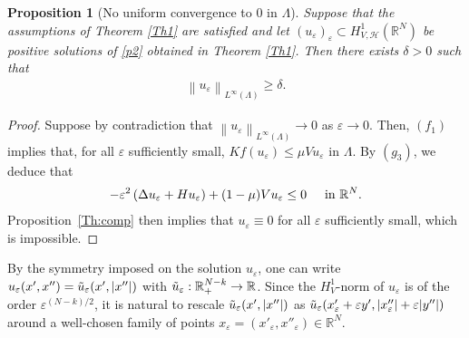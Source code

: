 \documentclass[a4paper]{amsart}
\newtheorem{proposition}{Proposition}[section]
\begin{document}
\begin{proposition}[No uniform convergence to $0$ in $\Lambda$]
 Suppose that the assumptions of Theorem \ref{Th1} are satisfied and let $(u_{\varepsilon})_{\varepsilon} \subset
H^1_{V,\mathcal{H}}({\mathbb{R}}^N)$ be positive solutions of \eqref{p2} obtained in Theorem \ref{Th1}. Then there exists $\delta
> 0$ such that 
\begin{align*}
 {\left\| {u_{\varepsilon}} \right\|}_{L^{\infty}(\Lambda)} \geq \delta.
\end{align*}
\end{proposition}
\begin{proof}
 Suppose by contradiction that ${\left\| {u_{\varepsilon}} \right\|}_{L^{\infty}(\Lambda)} \to 0$ as $\varepsilon \to 0$. Then, $(f_1)$
implies that, for all $\varepsilon$ sufficiently small, $K f(u_{\varepsilon}) \leq \mu V u_{\varepsilon}$ in $\Lambda$. By
$(g_3)$, we deduce that
\begin{align*}
 -\varepsilon^2 \left( \Delta u_{\varepsilon} + H u_{\varepsilon} \right) + (1 - \mu)V u_{\varepsilon} \leq 0 \hspace{0.5cm}
\text{in}\ {\mathbb{R}}^N.
\end{align*}
Proposition~\ref{Th:comp} then implies that $u_{\varepsilon} \equiv 0$ for all $\varepsilon$ sufficiently small, which is
impossible.
\end{proof}

 By the symmetry imposed on the solution $u_{\varepsilon}$, one can write $u_{\varepsilon}(x',x'') =
\Tilde{u}_{\varepsilon}(x',{\left| {x''} \right|})$ with $\Tilde{u}_{\varepsilon} : {\mathbb{R}}^{N-k}_+ \to {\mathbb{R}}$. Since the $H^1_V$-norm of $u_{\varepsilon}$ is of the order $\varepsilon^{(N-k)/2}$, it
is natural to rescale $\Tilde{u}_{\varepsilon}(x',{\left| {x''} \right|})$ as $\Tilde{u}_{\varepsilon}(x'_{\varepsilon} + \varepsilon y',
{\left| {x''_{\varepsilon}} \right|} + \varepsilon {\left| {y''} \right|})$ around a well-chosen family of points $x_{\varepsilon} =
(x'_{\varepsilon},x''_{\varepsilon}) \in {\mathbb{R}}^N$.
\end{document}
